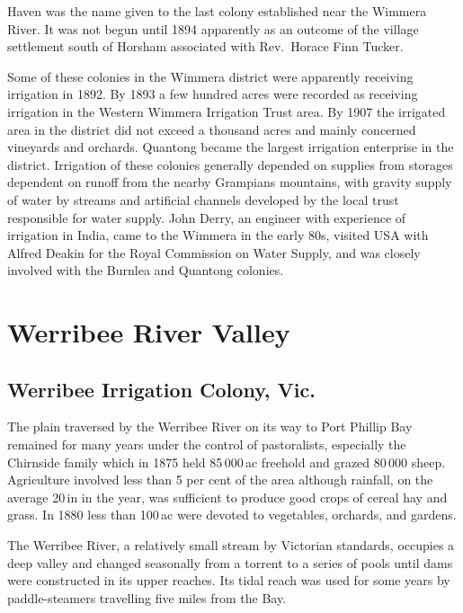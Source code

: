 Haven was the name given to the last colony established near the
Wimmera River.  It was not begun until 1894 apparently as an outcome
of the village settlement south of Horsham associated with Rev.~Horace
Finn Tucker.

Some of these colonies in the Wimmera district were apparently
receiving irrigation in 1892.  By 1893 a few hundred acres were
recorded as receiving irrigation in the Western Wimmera Irrigation
Trust area. By 1907 the irrigated area in the district did not exceed
a thousand acres and mainly concerned vineyards and orchards. Quantong
became the largest irrigation enterprise in the district.  Irrigation
of these colonies generally depended on supplies from storages
dependent on runoff from the nearby Grampians mountains, with gravity
supply of water by streams and artificial channels developed by the
local trust responsible for water supply. John Derry, an engineer with
experience of irrigation in India, came to the Wimmera in the early
80s, visited USA with Alfred Deakin for the Royal Commission on Water
Supply, and was closely involved with the Burnlea and Quantong
colonies.

\section*{Werribee River Valley}

\subsection*{Werribee Irrigation Colony, Vic.}

The plain traversed by the Werribee River on its way to Port Phillip
Bay remained for many years under the control of pastoralists,
especially the Chirnside family which in 1875 held 85\,000\,ac
freehold and grazed 80\,000 sheep.  Agriculture involved less than 5
per cent of the area although rainfall, on the average 20\,in in the
year, was sufficient to produce good crops of cereal hay and grass.
In 1880 less than 100\,ac were devoted to vegetables, orchards, and
gardens.

The Werribee River, a relatively small stream by Victorian standards,
occupies a deep valley and changed seasonally from a torrent to a
series of pools until dams were constructed in its upper reaches.  Its
tidal reach was used for some years by paddle-steamers travelling five
miles from the Bay.


